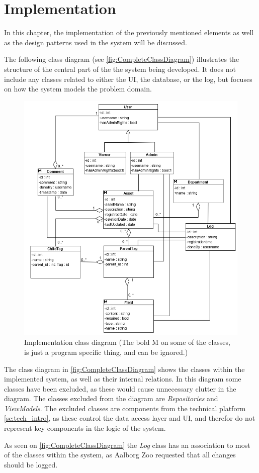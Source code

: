 \chapter{Implementation}
In this chapter, the implementation of the previously mentioned elements as well as the design patterns used in the system will be discussed.
\par
The following class diagram (see \autoref{fig:CompleteClassDiagram}) illustrates the structure of the central part of the the system being developed. It does not include any classes related to either the UI, the database, or the log, but focuses on how the system models the problem domain. 

\begin{figure}[H]
    \centering
    \includegraphics[width=1\textwidth]{figures/ClassDiagrams/ClassDiagramV6.PNG}
    \caption{Implementation class diagram (The bold M on some of the classes, is just a program specific thing, and can be ignored.)}
    \label{fig:CompleteClassDiagram}
\end{figure}

The class diagram in \autoref{fig:CompleteClassDiagram} shows the classes within the implemented system, as well as their internal relations. In this diagram some classes have been excluded, as these would cause unnecessary clutter in the diagram. The classes excluded from the diagram are \textit{Repositories} and \textit{ViewModels}. The excluded classes are components from the technical platform \autoref{sc:tech_intro}, as these control the data access layer and UI, and therefor do not represent key components in the logic of the system. 
\par
As seen on \autoref{fig:CompleteClassDiagram} the \textit{Log} class has an association to most of the classes within the system, as Aalborg Zoo requested that all changes should be logged. 